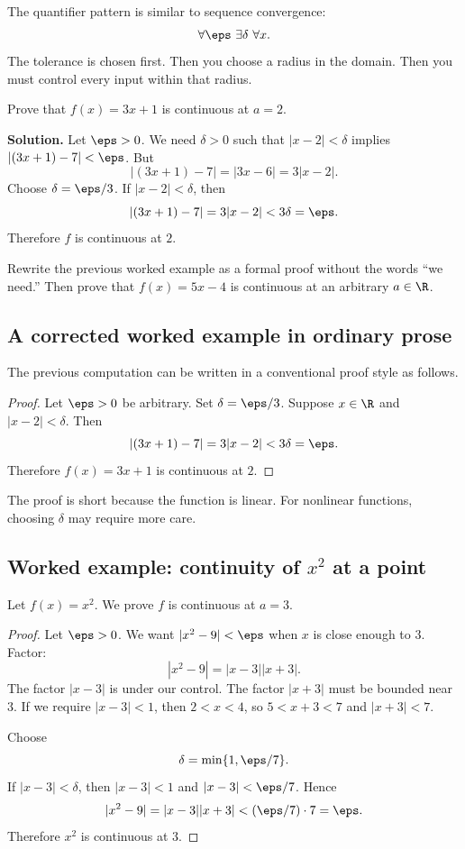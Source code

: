 The quantifier pattern is similar to sequence convergence:
\[
\forall\eps\ \exists\delta\ \forall x.
\]
The tolerance is chosen first. Then you choose a radius in the domain. Then you
must control every input within that radius.

\begin{example}
Prove that $f(x)=3x+1$ is continuous at $a=2$.

\textbf{Solution.} Let $\eps>0$. We need $\delta>0$ such that
$|x-2|<\delta$ implies $|(3x+1)-7|<\eps$. But
\[
|(3x+1)-7|=|3x-6|=3|x-2|.
\]
Choose $\delta=\eps/3$. If $|x-2|<\delta$, then
\[
|(3x+1)-7|=3|x-2|<3\delta=\eps.
\]
Therefore $f$ is continuous at $2$.
\end{example}

\begin{labbox}
Rewrite the previous worked example as a formal proof without the words
``we need.'' Then prove that $f(x)=5x-4$ is continuous at an arbitrary
$a\in\R$.
\end{labbox}

\subsection{A corrected worked example in ordinary prose}

The previous computation can be written in a conventional proof style as follows.

\begin{proof}
Let $\eps>0$ be arbitrary. Set $\delta=\eps/3$. Suppose $x\in\R$ and
$|x-2|<\delta$. Then
\[
|(3x+1)-7|=3|x-2|<3\delta=\eps.
\]
Therefore $f(x)=3x+1$ is continuous at $2$.
\end{proof}

The proof is short because the function is linear. For nonlinear functions,
choosing $\delta$ may require more care.

\subsection{Worked example: continuity of \texorpdfstring{$x^2$}{x squared} at a point}

Let $f(x)=x^2$. We prove $f$ is continuous at $a=3$.

\begin{proof}
Let $\eps>0$. We want $|x^2-9|<\eps$ when $x$ is close enough to $3$. Factor:
\[
|x^2-9|=|x-3||x+3|.
\]
The factor $|x-3|$ is under our control. The factor $|x+3|$ must be bounded
near $3$. If we require $|x-3|<1$, then $2<x<4$, so $5<x+3<7$ and
$|x+3|<7$.

Choose
\[
\delta=\min\{1,\eps/7\}.
\]
If $|x-3|<\delta$, then $|x-3|<1$ and $|x-3|<\eps/7$. Hence
\[
|x^2-9|=|x-3||x+3|<(\eps/7)\cdot 7=\eps.
\]
Therefore $x^2$ is continuous at $3$.
\end{proof}

